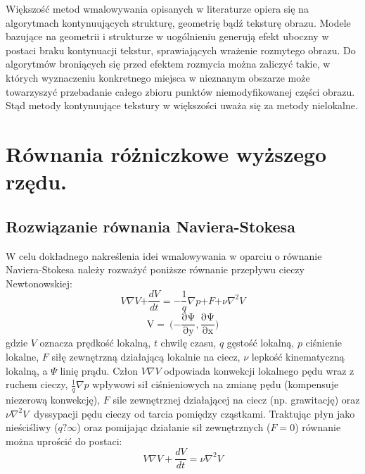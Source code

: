 \documentclass[12pt, twoside, openany]{report}
\theoremstyle{definition}
\begin{document}
Większość metod wmalowywania opisanych w literaturze opiera się na algorytmach kontynuujących strukturę, geometrię bądź teksturę obrazu. Modele bazujące na geometrii i strukturze w uogólnieniu generują efekt uboczny w postaci braku kontynuacji tekstur, sprawiających wrażenie rozmytego obrazu. Do algorytmów broniących się przed efektem rozmycia można zaliczyć takie, w których wyznaczeniu konkretnego miejsca w nieznanym obszarze może towarzyszyć przebadanie całego zbioru punktów niemodyfikowanej części obrazu. Stąd metody kontynuujące tekstury w większości uważa się za metody nielokalne.
\chapter{Równania różniczkowe wyższego rzędu.}
\label{chap:navierstokes}
\section{Rozwiązanie równania Naviera-Stokesa }
W celu dokładnego nakreślenia idei wmalowywania w oparciu o równanie Naviera-Stokesa należy rozważyć poniższe równanie przepływu cieczy Newtonowskiej:
\begin{equation}
V\nabla V\mathrm{+}\frac{dV}{dt}\mathrm{=-}\frac{\mathrm{1}}{q}\nabla p\mathrm{+}F\mathrm{+}\nu {\nabla }^{\mathrm{2}}V
\label{NavierStokesEquation}
\end{equation}
\begin{equation}
\mathrm{V=\ (-}\frac{\mathrm{\partial }\mathrm{\Psi }}{\mathrm{\partial }\mathrm{y}},\frac{\mathrm{\partial }\mathrm{\Psi }}{\mathrm{\partial }\mathrm{x}}\mathrm{)}
\label{LiquidVelociy}
\end{equation}
gdzie $V$ oznacza prędkość lokalną, $t$ chwilę czasu, $q$ gęstość lokalną, $p$ ciśnienie lokalne, $F$ siłę zewnętrzną działającą lokalnie na ciecz, $\nu$ lepkość kinematyczną lokalną, a $\mathit{\Psi}$ linię prądu. Człon $V\nabla V$ odpowiada konwekcji lokalnego pędu wraz z ruchem cieczy, $\frac{1}{q}\nabla p$ wpływowi sił ciśnieniowych na zmianę pędu (kompensuje niezerową konwekcję),  $F$ sile zewnętrznej działającej na ciecz (np. grawitację) oraz $\nu {\nabla }^2V\ $ dyssypacji pędu cieczy od tarcia pomiędzy cząstkami. Traktując płyn jako nieściśliwy ($q\textrm{?}\infty $)  oraz pomijając działanie sił zewnętrznych ($F=0$)  równanie można uprościć do postaci:
\begin{equation}
 V\nabla V+\frac{dV}{dt}=\nu {\nabla }^2V
\label{NavierStokesEquationShort}
\end{equation}
\end{document}
